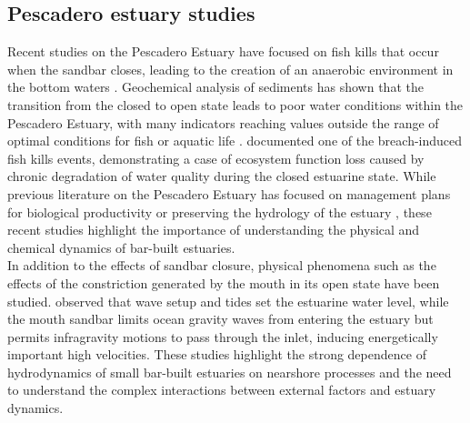 \documentclass[tesis.tex]{subfiles}
\begin{document}
\subsection{Pescadero estuary studies}

Recent studies on the Pescadero Estuary have focused on fish kills that occur when the sandbar closes, leading to the creation of an anaerobic environment in the bottom waters \citep{sloan2006ecological}. Geochemical analysis of sediments has shown that the transition from the closed to open state leads to poor water conditions within the Pescadero Estuary, with many indicators reaching values outside the range of optimal conditions for fish or aquatic life \citep{richards2018}. \cite{huber2020environmental} documented one of the breach-induced fish kills events, demonstrating a case of ecosystem function loss caused by chronic degradation of water quality during the closed estuarine state. While previous literature on the Pescadero Estuary has focused on management plans for biological productivity \citep{curry1985pescadero} or preserving the hydrology of the estuary \citep{williams1990pescadero}, these recent studies highlight the importance of understanding the physical and chemical dynamics of bar-built estuaries.\\

In addition to the effects of sandbar closure, physical phenomena such as the effects of the constriction generated by the mouth in its open state have been studied. \cite{williams2016} observed that wave setup and tides set the estuarine water level, while the mouth sandbar limits ocean gravity waves from entering the estuary but permits infragravity motions to pass through the inlet, inducing energetically important high velocities. These studies highlight the strong dependence of hydrodynamics of small bar-built estuaries on nearshore processes and the need to understand the complex interactions between external factors and estuary dynamics.\\
\end{document}
